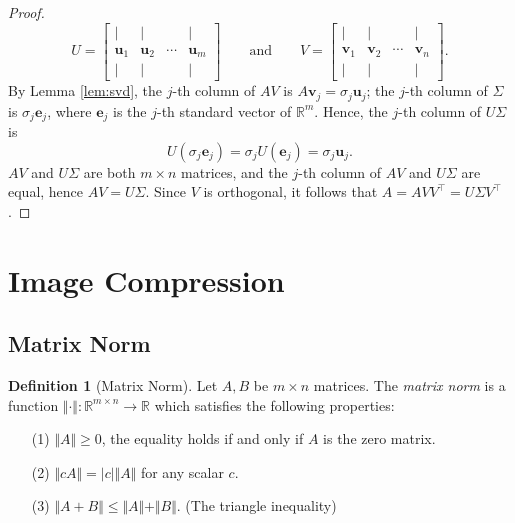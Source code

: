 \documentclass[12pt]{article}
\theoremstyle{definition}
\newtheorem{definition}[theorem]{Definition}
\begin{document}
\begin{proof}
    \[ U = 
    \begin{bmatrix}
        | & | &  & | \\
        \mathbf{u}_1 & \mathbf{u}_2 & \cdots & \mathbf{u}_m \\
        | & | &  & |
    \end{bmatrix}
    \qquad \text{and} \qquad
    V = 
    \begin{bmatrix}
        | & | &  & | \\
        \mathbf{v}_1 & \mathbf{v}_2 & \cdots & \mathbf{v}_n \\
        | & | &  & |
    \end{bmatrix}
    .
    \]
    By Lemma \ref{lem:svd}, the $j$-th column of $AV$ is $A\mathbf{v}_j=\sigma_j \mathbf{u}_j$; the $j$-th column of $\Sigma$ is $\sigma_j \mathbf{e}_j$, where $\mathbf{e}_j$ is the $j$-th standard vector of $\mathbb{R}^m$. Hence, the $j$-th column of $U\Sigma$ is 
    \[ U(\sigma_j \mathbf{e}_j) 
    = \sigma_j U(\mathbf{e}_j)
    =\sigma_j \mathbf{u}_j.
    \]
    $AV$ and $U\Sigma$ are both $m\times n$ matrices, and the $j$-th column of $AV$ and $U\Sigma$ are equal, hence $AV=U\Sigma$. Since $V$ is orthogonal, it follows that $A = AVV^\top = U\Sigma V^\top$.
\end{proof}


\section{Image Compression}
\subsection{Matrix Norm} \label{subsec:matrix_norm}
\begin{definition}[Matrix Norm]
    Let $A,B$ be $m\times n$ matrices. The \textit{matrix norm} is a function $\Vert\cdot\Vert: \mathbb{R}^{m\times n} \to \mathbb{R}$ which satisfies the following properties:
    \begin{enumerate}
        \item[(1)]
            $\Vert A\Vert \geq 0$, the equality holds if and only if $A$ is the zero matrix.
        \item[(2)]
            $\Vert cA\Vert = |c|\Vert A\Vert$ for any scalar $c$.
        \item[(3)]
            $\Vert A+B\Vert \leq \Vert A\Vert + \Vert B\Vert$. (The triangle inequality)   
    \end{enumerate}
\end{definition}
\end{document}
